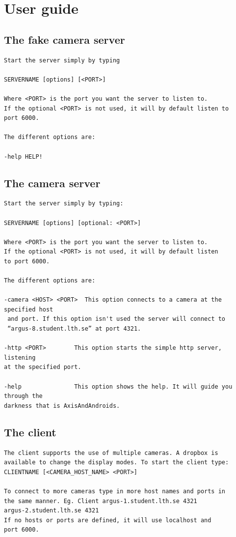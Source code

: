 \documentclass[8pt,titlepage]{article}
\begin{document}
\section{User guide}

\subsection{The fake camera server}
\begin{verbatim}
Start the server simply by typing 

SERVERNAME [options] [<PORT>]

Where <PORT> is the port you want the server to listen to. 
If the optional <PORT> is not used, it will by default listen to 
port 6000.

The different options are:

-help HELP!

\end{verbatim}

\subsection{The camera server}
\begin{verbatim}
Start the server simply by typing:

SERVERNAME [options] [optional: <PORT>]

Where <PORT> is the port you want the server to listen to. 
If the optional <PORT> is not used, it will by default listen 
to port 6000.

The different options are:

-camera <HOST> <PORT>  This option connects to a camera at the 
specified host
 and port. If this option isn't used the server will connect to 
 “argus-8.student.lth.se” at port 4321.

-http <PORT> 		This option starts the simple http server, listening 
at the specified port.

-help 				This option shows the help. It will guide you through the 
darkness that is AxisAndAndroids.
\end{verbatim}

\subsection{The client}
\begin{verbatim}
The client supports the use of multiple cameras. A dropbox is 
available to change the display modes. To start the client type:
CLIENTNAME [<CAMERA_HOST_NAME> <PORT>]

To connect to more cameras type in more host names and ports in 
the same manner. Eg. Client argus-1.student.lth.se 4321 
argus-2.student.lth.se 4321
If no hosts or ports are defined, it will use localhost and 
port 6000.
\end{verbatim}
\end{document}

